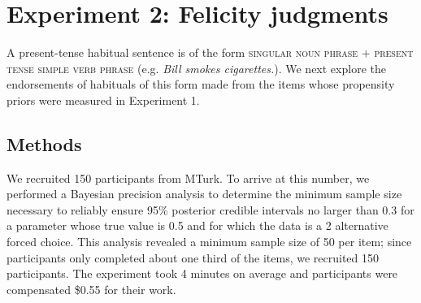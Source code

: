 \documentclass[10pt,letterpaper]{article}
\newcommand{\ndg}[1]{\textcolor{Green}{[ndg: #1]}}
\newcommand{\mht}[1]{\textcolor{DarkOrange}{[mht: #1]}}
\begin{document}



\section{Experiment 2: Felicity judgments}
A present-tense habitual sentence is of the form \textsc{singular noun phrase} $+$ \textsc{present tense simple verb phrase} (e.g. \emph{Bill smokes cigarettes.}).  
We next explore the endorsements of habituals of this form made from the items whose propensity priors were measured in Experiment 1. 

\subsection{Methods}

We recruited 150 participants from MTurk. %
To arrive at this number, we performed a Bayesian precision analysis to determine the minimum sample size necessary to reliably ensure 95\% posterior credible intervals no larger than 0.3 for a parameter whose true value is 0.5 and for which the data is a 2 alternative forced choice. This analysis revealed a minimum sample size of 50 per item; since participants only completed about one third of the items, we recruited 150 participants.
The experiment took 4 minutes on average and participants were compensated \$0.55 for their work.
\end{document}
